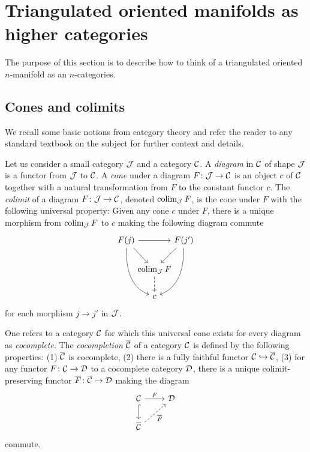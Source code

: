 
\section{Triangulated oriented manifolds as higher categories}

The purpose of this section is to describe how to think of a triangulated oriented $n$-manifold as an $n$-categories.

\subsection{Cones and colimits}

We recall some basic notions from category theory and refer the reader to any standard textbook on the subject for further context and details.

Let us consider a small category $\mathcal{J}$ and a category $\mathcal{C}$.
A \textit{diagram} in $\mathcal{C}$ of shape $\mathcal{J}$ is a functor from $\mathcal{J}$ to $\mathcal{C}$.
A \textit{cone} under a diagram $F \colon \mathcal{J} \to \mathcal{C}$ is an object $c$ of $\mathcal{C}$ together with a natural transformation from $F$ to the constant functor $c$.
The \textit{colimit} of a diagram $F \colon \mathcal{J} \to \mathcal{C}$, denoted $\operatorname*{colim}_{\mathcal{J}} F$, is the cone under $F$ with the following universal property: Given any cone $c$ under $F$, there is a unique morphism from $\operatorname*{colim}_{\mathcal{J}} F$ to $c$ making the following diagram commute
\[
\begin{tikzcd}[column sep=-5pt]
	F(j) \arrow[rr] \arrow[dr,in=135, out=-45] \arrow[ddr,in=160,out=-90] & &
	F(j') \arrow[dl,in=45, out=-135] \arrow[ddl,in=20,out=-90] \\
	& \colim_\cJ F \arrow[dashed,d]& \\
	& c &
\end{tikzcd}
\]
for each morphism $j \to j'$ in $\mathcal{J}$.

One refers to a category $\mathcal{C}$ for which this universal cone exists for every diagram as \textit{cocomplete}.
The \textit{cocompletion} $\overline{\mathcal{C}}$ of a category $\mathcal{C}$ is defined by the following properties: (1) $\overline{\mathcal{C}}$ is cocomplete, (2) there is a fully faithful functor $\mathcal{C} \hookrightarrow \overline{\mathcal{C}}$, (3) for any functor $F \colon \mathcal{C} \to \mathcal{D}$ to a cocomplete category $\mathcal{D}$, there is a unique colimit-preserving functor $\overline F \colon \overline{\mathcal{C}} \to \mathcal{D}$ making the diagram
\[
\begin{tikzcd}
	\cC \arrow[d,hook] \arrow[r,"F"] & \cD \\
	\overline\cC \arrow[ur,dashed,"\overline F"'] &
\end{tikzcd}
\]
commute.


